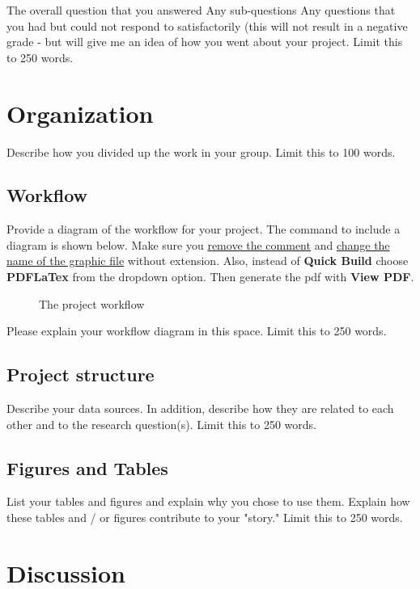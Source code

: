 \documentclass{article}
\begin{document}
The overall question that you answered
Any sub-questions
Any questions that you had but could not respond to satisfactorily (this will not result in a negative grade - but will give me an idea of how you went about your project. Limit this to 250 words.

\section{Organization}

Describe how you divided up the work in your group. Limit this to 100 words.


\subsection{Workflow}

Provide a diagram of the workflow for your project. The command to include a diagram is shown below. Make sure you \underline{remove the comment} and \underline{change the name of the graphic file} without extension. Also, instead of \textbf{Quick Build} choose \textbf{PDFLaTex} from the dropdown option. Then generate the pdf with \textbf{View PDF}.



\begin{figure}[hb]
  \centering
  \caption{The project workflow}

\end{figure}


Please explain your workflow diagram in this space. Limit this to 250 words.


\subsection{Project structure}

Describe your data sources. In addition, describe how they are related to each other and to the research question(s). Limit this to 250 words.

\subsection{Figures and Tables}

List your tables and figures and explain why you chose to use them. Explain how these tables and / or figures contribute to your "story." Limit this to 250 words.


\section{Discussion}
\end{document}
